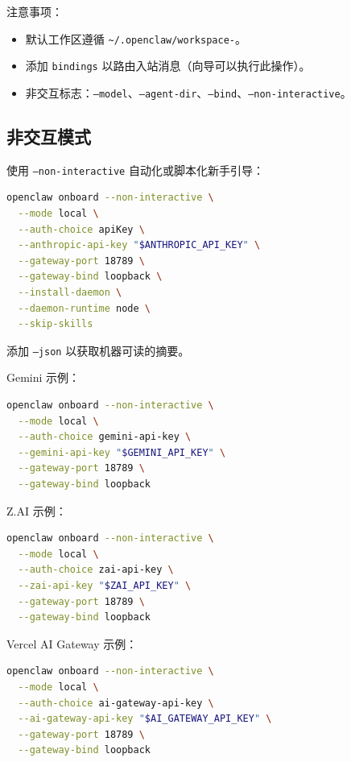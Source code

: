 注意事项：

\begin{itemize}
  \item 默认工作区遵循 \texttt{\textasciitilde{}/.openclaw/workspace-}。
  \item 添加 \texttt{bindings} 以路由入站消息（向导可以执行此操作）。
  \item 非交互标志：\texttt{--model}、\texttt{--agent-dir}、\texttt{--bind}、\texttt{--non-interactive}。
\end{itemize}


\subsection{非交互模式}


使用 \texttt{--non-interactive} 自动化或脚本化新手引导：

\begin{lstlisting}[language=bash]
openclaw onboard --non-interactive \
  --mode local \
  --auth-choice apiKey \
  --anthropic-api-key "$ANTHROPIC_API_KEY" \
  --gateway-port 18789 \
  --gateway-bind loopback \
  --install-daemon \
  --daemon-runtime node \
  --skip-skills
\end{lstlisting}


添加 \texttt{--json} 以获取机器可读的摘要。

Gemini 示例：

\begin{lstlisting}[language=bash]
openclaw onboard --non-interactive \
  --mode local \
  --auth-choice gemini-api-key \
  --gemini-api-key "$GEMINI_API_KEY" \
  --gateway-port 18789 \
  --gateway-bind loopback
\end{lstlisting}


Z.AI 示例：

\begin{lstlisting}[language=bash]
openclaw onboard --non-interactive \
  --mode local \
  --auth-choice zai-api-key \
  --zai-api-key "$ZAI_API_KEY" \
  --gateway-port 18789 \
  --gateway-bind loopback
\end{lstlisting}


Vercel AI Gateway 示例：

\begin{lstlisting}[language=bash]
openclaw onboard --non-interactive \
  --mode local \
  --auth-choice ai-gateway-api-key \
  --ai-gateway-api-key "$AI_GATEWAY_API_KEY" \
  --gateway-port 18789 \
  --gateway-bind loopback
\end{lstlisting}


